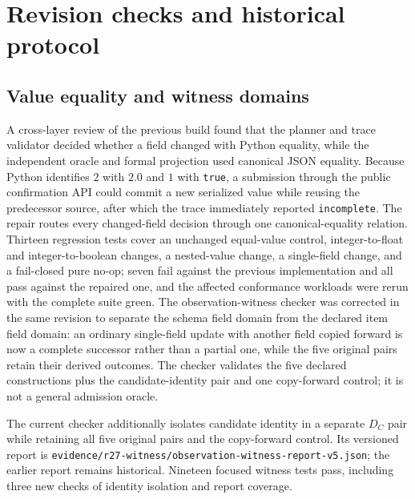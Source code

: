 \documentclass[preprint,12pt,authoryear]{elsarticle}
\newcommand{\code}[1]{\nolinkurl{#1}}
\begin{document}
\section{Revision checks and historical protocol}
\subsection{Value equality and witness domains}

A cross-layer review of the previous build found that the planner and trace validator decided whether a field changed with Python equality, while the independent oracle and formal projection used canonical JSON equality. Because Python identifies $2$ with $2.0$ and $1$ with \code{true}, a submission through the public confirmation API could commit a new serialized value while reusing the predecessor source, after which the trace immediately reported \code{incomplete}. The repair routes every changed-field decision through one canonical-equality relation. Thirteen regression tests cover an unchanged equal-value control, integer-to-float and integer-to-boolean changes, a nested-value change, a single-field change, and a fail-closed pure no-op; seven fail against the previous implementation and all pass against the repaired one, and the affected conformance workloads were rerun with the complete suite green. The observation-witness checker was corrected in the same revision to separate the schema field domain from the declared item field domain: an ordinary single-field update with another field copied forward is now a complete successor rather than a partial one, while the five original pairs retain their derived outcomes. The checker validates the five declared constructions plus the candidate-identity pair and one copy-forward control; it is not a general admission oracle.


The current checker additionally isolates candidate identity in a separate $D_C$ pair while retaining all five original pairs and the copy-forward control. Its versioned report is \code{evidence/r27-witness/observation-witness-report-v5.json}; the earlier report remains historical. Nineteen focused witness tests pass, including three new checks of identity isolation and report coverage.
\end{document}
